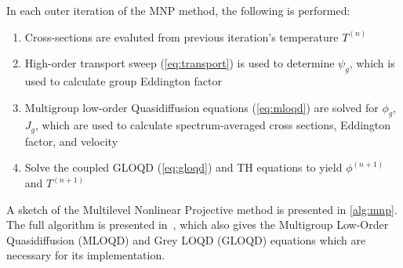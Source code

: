 \documentclass{proposal}
\newcommand*\Let[2]{\State{#1 $\gets$ #2}}
\begin{document}
In each outer iteration of the MNP method, the following is performed:

\begin{enumerate}
    \item Cross-sections are evaluted from previous iteration's temperature $T^{(n)}$
    \item High-order transport sweep (\cref{eq:transport}) is used to determine $\psi_g$, which is used to calculate group Eddington factor
    \item Multigroup low-order Quasidiffusion equations (\cref{eq:mloqd}) are solved for $\phi_g$, $J_g$, which are used to calculate spectrum-averaged cross sections, Eddington factor, and velocity
    \item Solve the coupled GLOQD (\cref{eq:gloqd}) and TH equations to yield $\phi^{(n+1)}$ and $T^{(n+1)}$
\end{enumerate}


A sketch of the Multilevel Nonlinear Projective method is presented in \autoref{alg:mnp}. The full algorithm is presented in~\cite{tamang2014multilevel}, which also gives the Multigroup Low-Order Quasidiffusion (MLOQD) and Grey LOQD (GLOQD) equations which are necessary for its implementation.

\begin{algorithm}
    \caption{MNP}\label{alg:mnp}
    \begin{algorithmic}[0]
        \Let{$n$}{$0$}
            \Let{$n$}{$n+1$}
            \Let{$s$}{$0$}
                \Let{$s$}{$s+1$}
                \Let{$l$}{$0$}
                    \Let{$l$}{$l+1$}

                \EndWhile{}

            \EndWhile{}
        \EndWhile{}
    \end{algorithmic}
\end{algorithm}
\end{document}
